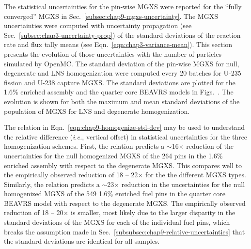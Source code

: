 The statistical uncertainties for the pin-wise \ac{MGXS} were reported for the ``fully converged'' \ac{MGXS} in Sec.~\ref{subsec:chap9-mgxs-uncertainty}. The \ac{MGXS} uncertainties were computed with uncertainty propagation (see Sec.~\ref{subsec:chap3-uncertainty-prop}) of the standard deviations of the reaction rate and flux tally means (see Eqn.~\ref{eqn:chap3-variance-mean}). This section presents the evolution of those uncertainties with the number of particles simulated by OpenMC. The standard deviation of the pin-wise \ac{MGXS} for null, degenerate and \ac{LNS} homogenization were computed every 20 batches for U-235 fission and U-238 capture \ac{MGXS}. The standard deviations are plotted for the 1.6\% enriched assembly and the quarter core \ac{BEAVRS} models in Figs.~. The evolution is shown for both the maximum and mean standard deviations of the population of \ac{MGXS} for \ac{LNS} and degenerate homogenization.

The relation in Eqn.~\ref{eqn:chap9-homogenize-std-dev} may be used to understand the relative difference (\textit{i.e.}, vertical offset) in statistical uncertainties for the three homogenization schemes. First, the relation predicts a $\sim$16$\times$ reduction of the uncertainties for the null homogenized \ac{MGXS} of the 264 pins in the 1.6\% enriched assembly with respect to the degenerate \ac{MGXS}. This compares well to the empirically observed reduction of 18 -- 22$\times$ for the the different \ac{MGXS} types. Similarly, the relation predicts a $\sim$23$\times$ reduction in the uncertainties for the null homogenized \ac{MGXS} of the 549 1.6\% enriched fuel pins in the quarter core \ac{BEAVRS} model with respect to the degenerate \ac{MGXS}. The empirically observed reduction of 18 -- 20$\times$ is smaller, most likely due to the larger disparity in the standard deviations of the \ac{MGXS} for each of the individual fuel pins, which breaks the assumption made in Sec.~\ref{subsubsec:chap9-relative-uncertainties} that the standard deviations are identical for all samples.

